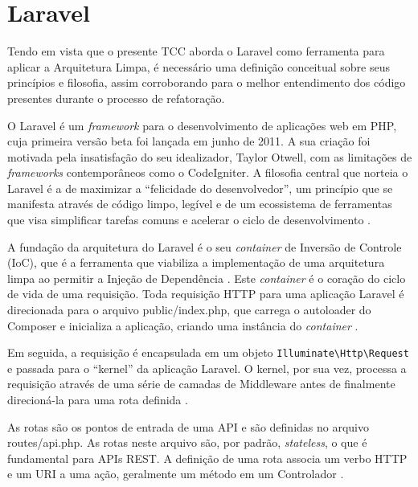 \section{Laravel}
    \par Tendo em vista que o presente TCC aborda o Laravel como ferramenta para aplicar a Arquitetura Limpa, é necessário uma definição conceitual sobre seus princípios e filosofia, assim corroborando para o melhor entendimento dos código presentes durante o processo de refatoração.
    
    \par O Laravel é um \textit{framework} para o desenvolvimento de aplicações web em PHP, cuja primeira versão beta foi lançada em junho de 2011. A sua criação foi motivada pela insatisfação do seu idealizador, Taylor Otwell, com as limitações de \textit{frameworks} contemporâneos como o CodeIgniter. A filosofia central que norteia o Laravel é a de maximizar a ``felicidade do desenvolvedor'', um princípio que se manifesta através de código limpo, legível e de um ecossistema de ferramentas que visa simplificar tarefas comuns e acelerar o ciclo de desenvolvimento \cite{livro:stauffer:2023:laravel}.

    \par A fundação da arquitetura do Laravel é o seu \textit{container} de Inversão de Controle (IoC), que é a ferramenta que viabiliza a implementação de uma arquitetura limpa ao permitir a Injeção de Dependência \cite{livro:otwell:2013:laravel}. Este \textit{container} é o coração do ciclo de vida de uma requisição. Toda requisição HTTP para uma aplicação Laravel é direcionada para o arquivo public/index.php, que carrega o autoloader do Composer e inicializa a aplicação, criando uma instância do \textit{container} \cite{livro:stauffer:2023:laravel}.
    
    \par Em seguida, a requisição é encapsulada em um objeto \verb|Illuminate\Http\Request| e passada para o ``kernel'' da aplicação Laravel. O kernel, por sua vez, processa a requisição através de uma série de camadas de Middleware antes de finalmente direcioná-la para uma rota definida \cite{livro:stauffer:2023:laravel}.

    \par As rotas são os pontos de entrada de uma API e são definidas no arquivo routes/api.php. As rotas neste arquivo são, por padrão, \textit{stateless}, o que é fundamental para APIs REST. A definição de uma rota associa um verbo HTTP e um URI a uma ação, geralmente um método em um Controlador \cite{livro:stauffer:2023:laravel}.

